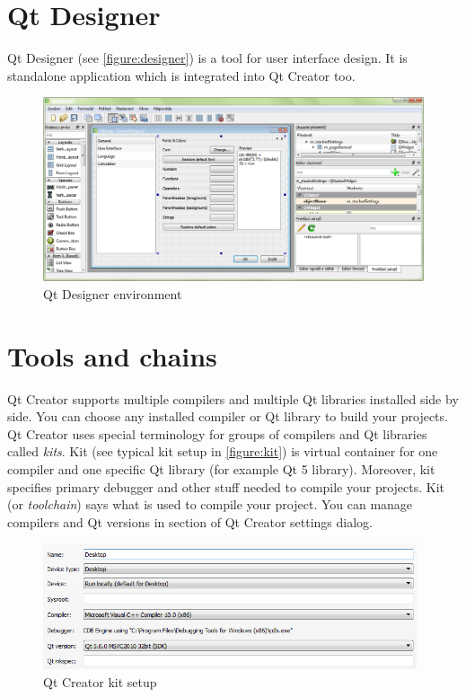\section{Qt Designer}
Qt Designer (see \autoref{figure:designer}) is a tool for user interface design. It is standalone application which is integrated into Qt Creator too.

\begin{figure}[ht]
\centering
\includegraphics[width=14.5cm]{graphics/laboratory/07-designer.png}
\caption{Qt Designer environment}\label{figure:designer}
\end{figure}

\section{Tools and chains}
Qt Creator supports multiple compilers and multiple Qt libraries installed side by side. You can choose any installed compiler or Qt library to build your projects. Qt Creator uses special terminology for groups of compilers and Qt libraries called \textit{kits}. Kit (see typical kit setup in \autoref{figure:kit}) is virtual container for one compiler and one specific Qt library (for example Qt 5 library). Moreover, kit specifies primary debugger and other stuff needed to compile your projects. Kit (or \textit{toolchain}) says what is used to compile your project. You can manage compilers and Qt versions in section of Qt Creator settings dialog.

\begin{figure}[ht]
\centering
\includegraphics[width=11cm]{graphics/laboratory/08-qtcreator-kits.png}
\caption{Qt Creator kit setup}\label{figure:kit}
\end{figure}

